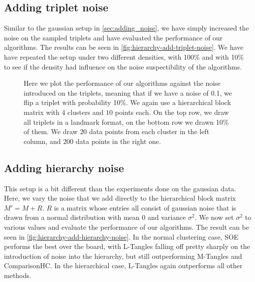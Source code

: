 \subsection{Adding triplet noise}\label{sec:h-triplet-noise}
Similar to the gaussian setup in \autoref{sec:adding_noise}, we have simply increased the noise on the sampled triplets and have evaluated the performance of our algorithms. The results
can be seen in \autoref{fig:hierarchy-add-triplet-noise}. We have have repeated the setup under two different densities, with 100\% and with 10\% to see if the density had influence
on the noise suspectibility of the algorithms.
\onecolumn
\begin{figure}[ht]
    \centering
    \hfill
    \caption{
        Here we plot the performance of our algorithms against the noise introduced on the triplets, meaning that if we
        have a noise of 0.1, we flip a triplet with probability 10\%.  We again use a hierarchical block matrix with $4$ clusters and $10$ points each. 
        On the top row, we draw all triplets in a landmark format, on the bottom row we drawn 10\% of them.    
        We draw $20$ data points from each cluster in the left column, and $200$ data points in the right one.
    }
    \label{fig:hierarchy-add-triplet-noise}
\end{figure}



\subsection{Adding hierarchy noise}\label{sec:adding-hierarchy-noise}
This setup is a bit different than the experiments done on the gaussian data. Here, we vary the noise that we add directly to the hierarchical block matrix $M' = M + R$. 
$R$ is a matrix whose entries all consist of gaussian noise that is drawn from a normal distribution with mean $0$ and variance $\sigma^2$. We now set $\sigma^2$ to various 
values and evaluate the performance of our algorithms. The result can be seen in \autoref{fig:hierarchy-add-hierarchy-noise}. In the normal clustering case, SOE performs the best over the board, with L-Tangles
falling off pretty sharply on the introduction of noise into the hierarchy, but still outperforming M-Tangles and ComparisonHC. In the hierarchical case, L-Tangles again outperforms all other methods.

